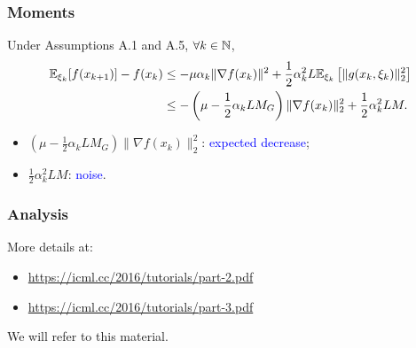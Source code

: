 \documentclass{beamer}
\begin{document}
\begin{frame}
\frametitle{Moments}

\begin{theorem}
	Under Assumptions A.1 and A.5, $\forall k \in {\mathbb{N}}$,
	\begin{align*}
		{\mathbb{E}}_{\xi_k}[f(x_{k+1})] - f(x_k)
		& \leq - \mu \alpha_k \| \nabla f(x_k) \|^2
		+ \frac{1}{2} \alpha_k^2 L {\mathbb{E}}_{\xi_k} \left[ \| g(x_k, \xi_k )\|_2^2 \right] \\
		& \leq - \left( \mu -\frac{1}{2}\alpha_k LM_G \right) \| \nabla f(x_k) \|_2^2
		+ \frac{1}{2} \alpha_k^2 LM.
	\end{align*}
\end{theorem}
\begin{itemize}
	\item $\left( \mu -\frac{1}{2}\alpha_k LM_G \right) \| \nabla f(x_k) \|_2^2$: \textcolor{blue}{expected decrease};
	\item $\frac{1}{2} \alpha_k^2 LM$: \textcolor{blue}{noise}.
\end{itemize}

\end{frame}

\begin{frame}
\frametitle{Analysis}

More details at:
\begin{itemize}
\item 
\url{https://icml.cc/2016/tutorials/part-2.pdf}
\item 
\url{https://icml.cc/2016/tutorials/part-3.pdf}
\end{itemize}

We will refer to this material.

\end{frame}
\end{document}
